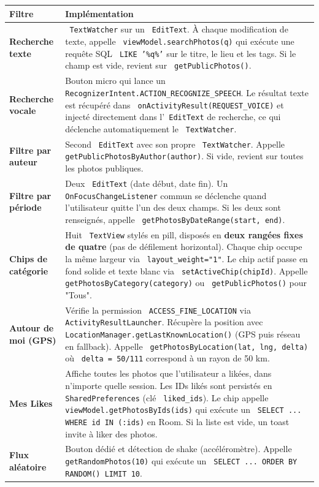 \documentclass[a4paper,12pt,openany]{report}
\newcommand{\ic}[1]{\texttt{\small\colorbox{lightbg}{\color{navy!90} #1}}}
\begin{document}
\begin{tabularx}{\textwidth}{>{\bfseries}l X}
  \toprule
  Filtre & Implémentation \\
  \midrule
  Recherche texte
    & \ic{TextWatcher} sur un \ic{EditText}. À chaque modification de texte,
      appelle \ic{viewModel.searchPhotos(q)} qui exécute une requête SQL
      \ic{LIKE '\%q\%'} sur le titre, le lieu et les tags.
      Si le champ est vide, revient sur \ic{getPublicPhotos()}. \\
  Recherche vocale
    & Bouton micro qui lance un \ic{RecognizerIntent.ACTION\_RECOGNIZE\_SPEECH}.
      Le résultat texte est récupéré dans \ic{onActivityResult(REQUEST\_VOICE)}
      et injecté directement dans l'\ic{EditText} de recherche, ce qui
      déclenche automatiquement le \ic{TextWatcher}. \\
  Filtre par auteur
    & Second \ic{EditText} avec son propre \ic{TextWatcher}. Appelle
      \ic{getPublicPhotosByAuthor(author)}. Si vide, revient sur toutes
      les photos publiques. \\
  Filtre par période
    & Deux \ic{EditText} (date début, date fin). Un \ic{OnFocusChangeListener}
      commun se déclenche quand l'utilisateur quitte l'un des deux champs.
      Si les deux sont renseignés, appelle \ic{getPhotosByDateRange(start, end)}. \\
  Chips de catégorie
    & Huit \ic{TextView} stylés en pill, disposés en \textbf{deux rangées fixes
      de quatre} (pas de défilement horizontal). Chaque chip occupe la même
      largeur via \ic{layout\_weight="1"}. Le chip actif passe en fond solide
      et texte blanc via \ic{setActiveChip(chipId)}.
      Appelle \ic{getPhotosByCategory(category)} ou \ic{getPublicPhotos()} pour "Tous". \\
  Autour de moi (GPS)
    & Vérifie la permission \ic{ACCESS\_FINE\_LOCATION} via
      \ic{ActivityResultLauncher}. Récupère la position avec
      \ic{LocationManager.getLastKnownLocation()} (GPS puis réseau en fallback).
      Appelle \ic{getPhotosByLocation(lat, lng, delta)} où \ic{delta = 50/111}
      correspond à un rayon de 50 km. \\
  Mes Likes
    & Affiche toutes les photos que l'utilisateur a likées, dans n'importe
      quelle session. Les IDs likés sont persistés en \ic{SharedPreferences}
      (clé \ic{liked\_ids}). Le chip appelle \ic{viewModel.getPhotosByIds(ids)}
      qui exécute un \ic{SELECT ... WHERE id IN (:ids)} en Room. Si la liste
      est vide, un toast invite à liker des photos. \\
  Flux aléatoire
    & Bouton dédié et détection de shake (accéléromètre). Appelle
      \ic{getRandomPhotos(10)} qui exécute un \ic{SELECT ... ORDER BY RANDOM() LIMIT 10}. \\
  \bottomrule
\end{tabularx}
\end{document}
